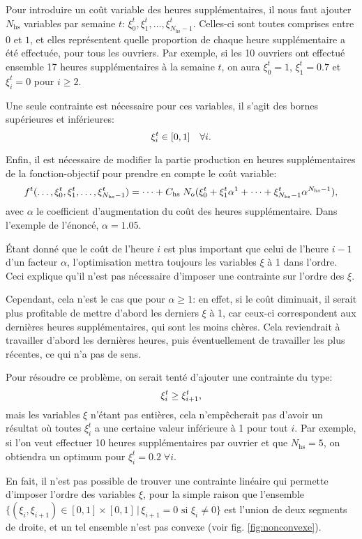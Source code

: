 Pour introduire un coût variable des heures supplémentaires, il nous faut ajouter $N_\mathrm{hs}$ variables par semaine $t$: $\xi_0^t, \xi_1^t, \dots, \xi_{N_\mathrm{hs}-1}^t$. Celles-ci sont toutes comprises entre $0$ et $1$, et elles représentent quelle proportion de chaque heure supplémentaire a été effectuée, pour tous les ouvriers.
Par exemple, si les 10 ouvriers ont effectué ensemble 17 heures supplémentaires à la semaine $t$, on aura $\xi_0^t = 1$, $\xi_1^t = 0.7$ et $\xi_i^t = 0$ pour $i \geq 2$.

Une seule contrainte est nécessaire pour ces variables, il s'agit des bornes supérieures et inférieures:
\[
    \xi_i^t \in [0, 1]
    \quad\forall i
    \text.
\]

Enfin, il est nécessaire de modifier la partie \og{}production en heures supplémentaires\fg{} de la fonction-objectif pour prendre en compte le coût variable:
\[
    f^t(\dots, \xi_0^t, \xi_1^t, \dots, \xi_{N_\mathrm{hs}-1}^t)
    = \dots + C_\mathrm{hs}\;N_\mathrm{o}(\xi_0^t + \xi_1^t \alpha^1 + \dots + \xi_{N_\mathrm{hs}-1}^t \alpha^{N_\mathrm{hs}-1})
    \text,
\]
avec $\alpha$ le coefficient d'augmentation du coût des heures supplémentaire. Dans l'exemple de l'énoncé, $\alpha = 1.05$.

Étant donné que le coût de l'heure $i$ est plus important que celui de l'heure $i-1$ d'un facteur $\alpha$, l'optimisation mettra toujours les variables $\xi$ à 1 dans l'ordre. Ceci explique qu'il n'est pas nécessaire d'imposer une contrainte sur l'ordre des $\xi$.

Cependant, cela n'est le cas que pour $\alpha \geq 1$: en effet, si le coût diminuait, il serait plus profitable de mettre d'abord les derniers $\xi$ à 1, car ceux-ci correspondent aux dernières heures supplémentaires, qui sont les moins chères. Cela reviendrait à travailler d'abord les dernières heures, puis éventuellement de travailler les plus récentes, ce qui n'a pas de sens.

Pour résoudre ce problème, on serait tenté d'ajouter une contrainte du type:
\[
    \xi_i^t \geq \xi_{i+1}^t
    \text,
\]
mais les variables $\xi$ n'étant pas entières, cela n'empêcherait pas d'avoir un résultat où toutes $\xi_i^t$ a une certaine valeur inférieure à 1 pour tout $i$. Par exemple, si l'on veut effectuer 10 heures supplémentaires par ouvrier et que $N_\mathrm{hs} = 5$, on obtiendra un optimum pour $\xi_i^t = 0.2 \;\forall i$.

En fait, il n'est pas possible de trouver une contrainte linéaire qui permette d'imposer l'ordre des variables $\xi$, pour la simple raison que l'ensemble $\{(\xi_i, \xi_{i+1}) \in [0, 1]\!\times\![0, 1] \,|\, \xi_{i+1} = 0 \text{ si } \xi_i \neq 0\}$ est l'union de deux segments de droite, et un tel ensemble n'est pas convexe (voir fig. \ref{fig:nonconvexe}).

